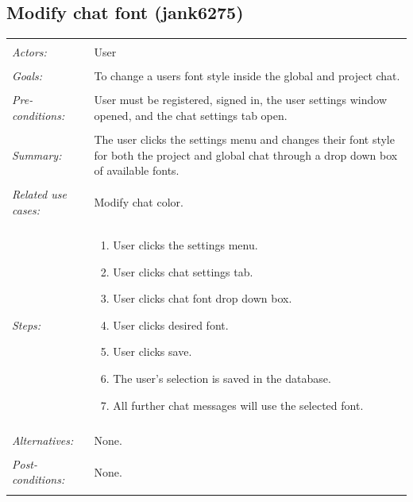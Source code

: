 \documentclass[11pt]{report}
\begin{document}
\subsection{Modify chat font (jank6275)}
\begin{tabular}{ p{2cm} p{12cm} }
 \hline
 \\
 \textit{Actors:} & User \\ 
 \\
 \textit{Goals:} & To change a users font style inside the global and project chat. \\
 \\
 \textit{Pre-conditions:} & User must be registered, signed in, the user settings window opened, and the chat settings tab open.  \\
 \\
 \textit{Summary:} & The user clicks the settings menu and changes their font style for both the project and global chat through a drop down box of available fonts. \\ 
 \\
 \textit{Related use cases:} & Modify chat color. \\ 
 \\
 \textit{Steps:} & \begin{enumerate}
  \item User clicks the settings menu.
  \item User clicks chat settings tab.
  \item User clicks chat font drop down box.
  \item User clicks desired font.
  \item User clicks save.
  \item The user's selection is saved in the database.
  \item All further chat messages will use the selected font.
 \end{enumerate} \\
 \\
 \textit{Alternatives:} & None. \\
 \\
 \textit{Post-conditions:} & None. \\
 \\
\hline
\end{tabular}
\end{document}
